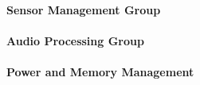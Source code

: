 \paragraph{Sensor Management Group}

\paragraph{Audio Processing Group}

\paragraph{Power and Memory Management}


% 
% 

